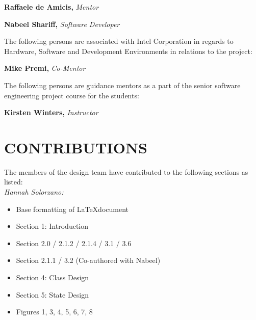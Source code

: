 \documentclass[draftclsnofoot,onecolumn,compsoc]{IEEEtran}
\begin{document}
\noindent\leavevmode\rlap{}\hfill{\textbf{Raffaele de Amicis,} \textit{Mentor}}\hfill\llap{}\par
\bigskip
\noindent\leavevmode{}\hfill{\textbf{Nabeel Shariff,} \textit{Software Developer}}\hfill{}\par

\bigskip
\noindent
The following persons are associated with Intel Corporation in regards to Hardware, Software and Development Environments in relations to the project:
\bigskip

\noindent\leavevmode\rlap{}\hfill{\textbf{Mike Premi,} \textit{Co-Mentor}}\hfill\llap{}\par

\bigskip
\noindent
The following persons are guidance mentors as a part of the senior software engineering project course for the students:
\bigskip

\noindent\leavevmode{}\hfill{\textbf{Kirsten Winters,} \textit{Instructor}}\hfill{}\par

\newpage


\tableofcontents 

\newpage


\section*{CONTRIBUTIONS} 
The members of the design team have contributed to the following sections as listed:
~ \\

\noindent
\textit{Hannah Solorzano:}
	\begin{itemize}
		\item Base formatting of \LaTeX  document
        \item Section 1: Introduction
        \item Section 2.0 / 2.1.2 / 2.1.4 / 3.1 / 3.6
        \item Section 2.1.1 / 3.2 (Co-authored with Nabeel)
        \item Section 4: Class Design
        \item Section 5: State Design
        \item Figures 1, 3, 4, 5, 6, 7, 8
	\end{itemize}
\end{document}
